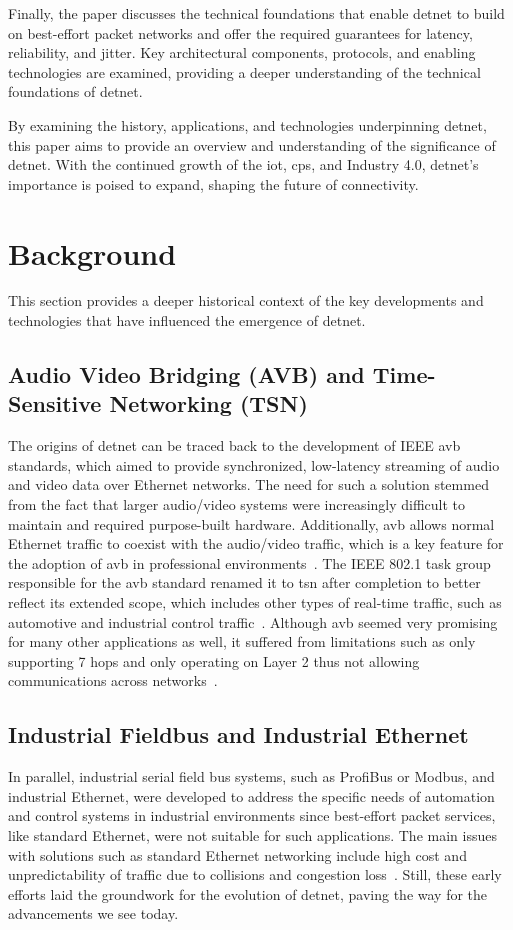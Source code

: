 \documentclass[runningheads]{llncs}
\begin{document}
Finally, the paper discusses the technical foundations that enable \gls{detnet} to build on best-effort packet networks and offer the required guarantees for latency, reliability, and jitter. Key architectural components, protocols, and enabling technologies are examined, providing a deeper understanding of the technical foundations of \gls{detnet}.

By examining the history, applications, and technologies underpinning \gls{detnet}, this paper aims to provide an overview and understanding of the significance of \gls{detnet}. With the continued growth of the \gls{iot}, \gls{cps}, and Industry 4.0, \gls{detnet}'s importance is poised to expand, shaping the future of connectivity.

\section{Background}

This section provides a deeper historical context of the key developments and technologies that have influenced the emergence of \gls{detnet}.

\subsection*{Audio Video Bridging (AVB) and Time-Sensitive Networking (TSN)}
The origins of \gls{detnet} can be traced back to the development of IEEE \gls{avb} standards, which aimed to provide synchronized, low-latency streaming of audio and video data over Ethernet networks. The need for such a solution stemmed from the fact that larger audio/video systems were increasingly difficult to maintain and required purpose-built hardware. Additionally, \gls{avb} allows normal Ethernet traffic to coexist with the audio/video traffic, which is a key feature for the adoption of \gls{avb} in professional environments~\cite{Lim2012}. The IEEE 802.1 task group responsible for the \gls{avb} standard renamed it to \gls{tsn} after completion to better reflect its extended scope, which includes other types of real-time traffic, such as automotive and industrial control traffic~\cite{Wollschlaeger2017}. Although \gls{avb} seemed very promising for many other applications as well, it suffered from limitations such as only supporting 7 hops and only operating on Layer 2 thus not allowing communications across networks~\cite{Imtiaz2009}.

\subsection*{Industrial Fieldbus and Industrial Ethernet}
In parallel, industrial serial field bus systems, such as ProfiBus or Modbus, and industrial Ethernet, were developed to address the specific needs of automation and control systems in industrial environments since best-effort packet services, like standard Ethernet, were not suitable for such applications. The main issues with solutions such as standard Ethernet networking include high cost and unpredictability of traffic due to collisions and congestion loss~\cite{Finn2018}. Still, these early efforts laid the groundwork for the evolution of \gls{detnet}, paving the way for the advancements we see today. 
\end{document}
